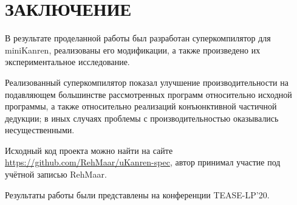 \section*{ЗАКЛЮЧЕНИЕ}

В результате проделанной работы был разработан суперкомпилятор для miniKanren,
реализованы его модификации, а также произведено их экспериментальное исследование.

Реализованный суперкомпилятор показал улучшение производительности на подавляющем
большинстве рассмотренных программ относительно исходной программы, а также относительно
реализаций конъюнктивной частичной дедукции;
в иных случаях проблемы с производительностью оказывались несущественными.

Исходный код проекта можно найти на сайте \url{https://github.com/RehMaar/uKanren-spec},
автор принимал участие под учётной записью RehMaar.

Результаты работы были представлены на конференции TEASE-LP'20.

